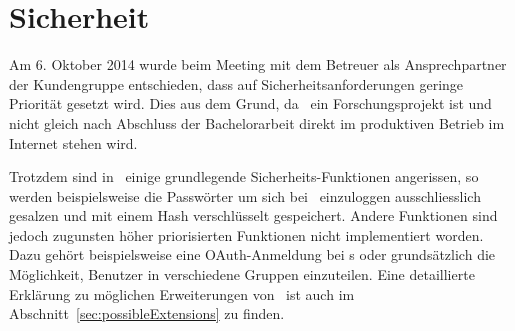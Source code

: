 \section{Sicherheit}
	Am 6. Oktober 2014 wurde beim Meeting mit dem Betreuer als Ansprechpartner der Kundengruppe entschieden,
	dass auf Sicherheitsanforderungen geringe Priorität gesetzt wird.
	Dies aus dem Grund, da \eeppi\ ein Forschungsprojekt ist
	und nicht gleich nach Abschluss der Bachelorarbeit direkt im produktiven Betrieb im Internet stehen wird.
	
	Trotzdem sind in \eeppi\ einige grundlegende Sicherheits-Funktionen angerissen,
	so werden beispielsweise die Passwörter um sich bei \eeppi\ einzuloggen ausschliesslich gesalzen und mit einem Hash verschlüsselt gespeichert.
	Andere Funktionen sind jedoch zugunsten höher priorisierten Funktionen nicht implementiert worden.
	Dazu gehört beispielsweise eine OAuth-Anmeldung bei \ppt s oder grundsätzlich die Möglichkeit,
	Benutzer in verschiedene Gruppen einzuteilen.
	Eine detaillierte Erklärung zu möglichen Erweiterungen von \eeppi\ ist auch im Abschnitt\ \ref{sec:possibleExtensions} zu finden.